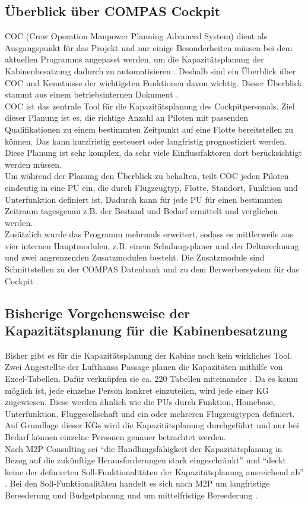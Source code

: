 \documentclass [12pt, a4paper, oneside, titlepage, ngerman]{article}
\begin{document}
\subsection{Überblick über COMPAS Cockpit}
\ac{COC} (Crew Operation Manpower Planning Advanced System) dient als Ausgangspunkt für das Projekt und nur einige Besonderheiten müssen bei dem aktuellen Programms angepasst werden, um die Kapazitätsplanung der Kabinenbesatzung dadurch zu automatisieren \cite[vgl.][]{Gespraech1}. Deshalb sind ein Überblick über \ac{COC} und Kenntnisse der wichtigsten Funktionen davon wichtig. Dieser Überblick stammt aus einem betriebsinternen Dokument \cite[vgl.][]{compasdoku}. \\
\ac{COC} ist das zentrale Tool für die Kapazitätsplanung des Cockpitpersonals. Ziel dieser Planung ist es, die richtige Anzahl an Piloten mit passenden Qualifikationen zu einem bestimmten Zeitpunkt auf eine Flotte bereitstellen zu können. Das kann kurzfristig gesteuert oder langfristig prognostiziert werden. Diese Planung ist sehr komplex, da sehr viele Einflussfaktoren dort berücksichtigt werden müssen. \\
Um während der Planung den Überblick zu behalten, teilt \ac{COC} jeden Piloten eindeutig in eine \ac{PU} ein, die durch Flugzeugtyp, Flotte, Standort, Funktion und Unterfunktion definiert ist. Dadurch kann für jede \ac{PU} für einen bestimmten Zeitraum tagesgenau z.B. der Bestand und Bedarf ermittelt und verglichen werden. \\

\noindent Zusätzlich wurde das Programm mehrmals erweitert, sodass es mittlerweile aus vier internen Hauptmodulen, z.B. einem Schulungsplaner und der Deltarechnung und zwei angrenzenden Zusatzmodulen besteht. Die Zusatzmodule sind Schnittstellen zu der COMPAS Datenbank und zu dem Berwerbersystem für das Cockpit \cite[vgl.][S.19]{compasdoku}.


\subsection{Bisherige Vorgehensweise der Kapazitätsplanung für die Kabinenbesatzung} \label{vorgehensweise}
Bisher gibt es für die Kapazitätsplanung der Kabine noch kein wirkliches Tool. Zwei Angestellte der Lufthansa Passage planen die Kapazitäten mithilfe von Excel-Tabellen. Dafür verknüpfen sie ca. 220 Tabellen miteinander \cite[vgl.][]{Gespraech2}. Da es kaum möglich ist, jede einzelne Person konkret einzuteilen, wird jede einer \ac{KG} zugewiesen. Diese werden ähnlich wie die \acp{PU} durch Funktion, Homebase, Unterfunktion, Fluggesellschaft und ein oder mehreren Flugzeugtypen definiert. Auf Grundlage dieser \acp{KG} wird die Kapazitätsplanung durchgeführt und nur bei Bedarf können einzelne Personen genauer betrachtet werden.  \\
Nach M2P Consulting sei "`die Handlungsfähigkeit der Kapazitätsplanung in Bezug auf die zukünftige Herausforderungen stark eingeschränkt"' \cite[S.5]{M2P} und "`deckt keine der definierten Soll-Funktionalitäten der Kapazitätsplanung ausreichend ab"' \cite[S.6]{M2P}. Bei den Soll-Funktionalitäten handelt es sich nach M2P um langfristige Bereederung und Budgetplanung und um mittelfristige Bereederung \cite[vgl.][S.6]{M2P}.
\end{document}
